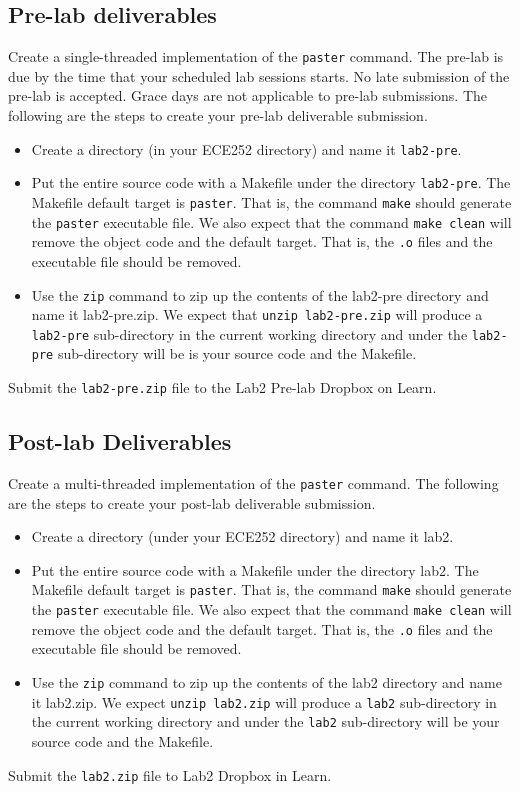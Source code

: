 \subsection{Pre-lab deliverables}
\label{sec:lab2-pre-lab-deliverable}
Create a single-threaded implementation of the \verb+paster+ command. The pre-lab is due by the time that your scheduled lab sessions starts. No late submission of the pre-lab is accepted. Grace days are not applicable to pre-lab submissions. The following are the steps to create your pre-lab deliverable submission.
\begin{itemize}
\item Create a directory (in your ECE252 directory) and name it \verb+lab2-pre+.
\item Put the entire source code with a Makefile under the directory \verb+lab2-pre+. The Makefile default target is \verb+paster+. That is, the command \verb+make+ should generate the \verb+paster+ executable file. We also expect that the command \verb+make clean+ will remove the object code and the default target. That is, the \verb+.o+ files and the executable file should be removed.
\item Use the \verb+zip+ command to zip up the contents of the lab2-pre directory and name it lab2-pre.zip. We expect that \verb+unzip lab2-pre.zip+ will produce a \verb+lab2-pre+ sub-directory in the current working directory and under the \verb+lab2-pre+ sub-directory will be is your source code and the Makefile.
\end{itemize}
Submit the \verb+lab2-pre.zip+ file to the Lab2 Pre-lab Dropbox on Learn.
\subsection{Post-lab Deliverables}
\label{sec:lab2-post-lab-deliverable}
Create a multi-threaded implementation of the \verb+paster+ command.
The following are the steps to create your post-lab deliverable submission.
\begin{itemize}
\item Create a directory (under your ECE252 directory) and name it lab2.
\item Put the entire source code with a Makefile under the directory lab2. The Makefile default target is \verb+paster+. That is, the command \verb+make+ should generate the \verb+paster+ executable file. We also expect that the command \verb+make clean+ will remove the object code and the default target. That is, the \verb+.o+ files and the executable file should be removed.
\item Use the \verb+zip+ command to zip up the contents of the lab2 directory and name it lab2.zip. We expect \verb+unzip lab2.zip+ will produce a \verb+lab2+ sub-directory in the current working directory and under the \verb+lab2+ sub-directory will be your source code and the Makefile.
\end{itemize}
Submit the \verb+lab2.zip+ file to Lab2 Dropbox in Learn.


